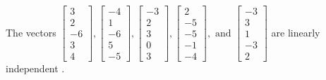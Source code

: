 \begin{exercise}
\begin{exerciseStatement}
  \end{exerciseStatement}
  \begin{exerciseAnswer}
   The vectors \(\left[\begin{array}{r}
3 \\
2 \\
-6 \\
3 \\
4
\end{array}\right] , \left[\begin{array}{r}
-4 \\
1 \\
-6 \\
5 \\
-5
\end{array}\right] , \left[\begin{array}{r}
-3 \\
2 \\
3 \\
0 \\
3
\end{array}\right] , \left[\begin{array}{r}
2 \\
-5 \\
-5 \\
-1 \\
-4
\end{array}\right] , \text{ and } \left[\begin{array}{r}
-3 \\
3 \\
1 \\
-3 \\
2
\end{array}\right]\) are 
  	 linearly independent  .
  


  \end{exerciseAnswer}
\end{exercise}